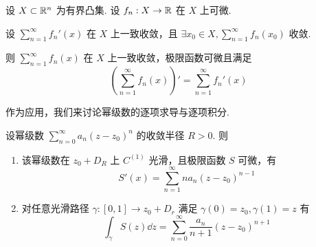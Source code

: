 \begin{inference}
    设 $X\subset\mathbb{R}^n$ 为有界凸集. 设 $f_n:X\to\mathbb{R}$ 在 $X$ 上可微.

    设 $\sum\limits_{n=1}^\infty f_n'(x)$ 在 $X$ 上一致收敛，且 $\exists x_0\in X,\sum\limits_{n=1}^\infty f_n(x_0)$ 收敛.

    则 $\sum\limits_{n=1}^\infty f_n(x)$ 在 $X$ 上一致收敛，极限函数可微且满足
$$
\left(\sum\limits_{n=1}^\infty f_n(x)\right)'=\sum\limits_{n=1}^\infty f_n'(x)
$$
\end{inference}

作为应用，我们来讨论幂级数的逐项求导与逐项积分.

\begin{property}
    设幂级数 $\sum\limits_{n=0}^\infty a_n(z-z_0)^n$ 的收敛半径 $R>0$. 则

    \begin{enumerate}
        \item 该幂级数在 $z_0+D_R$ 上 $C^{(1)}$ 光滑，且极限函数 $S$ 可微，有
$$
S'(x)=\sum_{n=1}^\infty na_n(z-z_0)^{n-1}
$$

        \item 对任意光滑路径 $\gamma:[0,1]\to z_0+D_r$ 满足 $\gamma(0)=z_0,\gamma(1)=z$ 有
$$
\int_\gamma S(z)\dd z=\sum_{n=0}^\infty\frac{a_n}{n+1}(z-z_0)^{n+1}
$$
    \end{enumerate}
\end{property}


